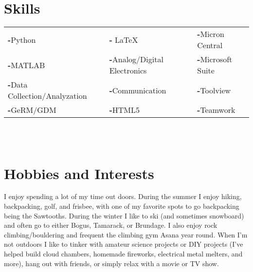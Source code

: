 \documentclass[a4paper,12pt]{article}
\begin{document}
\section{Skills}
    \begin{tabular}{|p{}|p{}|p{}}
         \textbf{-}Python & \textbf{-} \LaTeX & \textbf{-}Micron Central \\
         \textbf{-}MATLAB & \textbf{-}Analog/Digital Electronics & \textbf{-}Microsoft Suite \\
         \textbf{-}Data Collection/Analyzation & \textbf{-}Communication & \textbf{-}Toolview \\
         \textbf{-}GeRM/GDM & \textbf{-}HTML5 & \textbf{-}Teamwork \\
    \end{tabular}
\\
\\
\section{Hobbies and Interests}
I enjoy spending a lot of my time out doors. During the summer I enjoy hiking, backpacking, golf, and frisbee, with one of my favorite spots to go backpacking being the Sawtooths. During the winter I like to ski (and sometimes snowboard) and often go to either Bogus, Tamarack, or Brundage. I also enjoy rock climbing/bouldering and frequent the climbing gym Asana year round. When I'm not outdoors I like to tinker with amateur science projects or DIY projects (I've helped build cloud chambers, homemade fireworks, electrical metal melters, and more), hang out with friends, or simply relax with a movie or TV show. 
\end{document}
